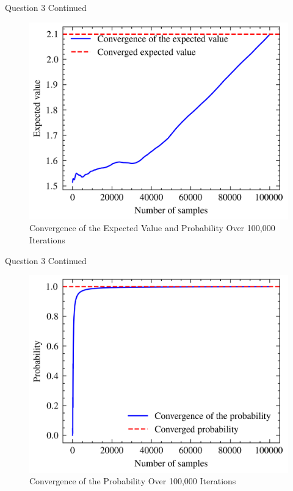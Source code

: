 \documentclass[compress,12pt]{beamer}
\begin{document}
\begin{frame}{Question 3 Continued}
    \begin{figure}
        \centering
        \includegraphics{imgs/convergence2.png}
        \caption{Convergence of the Expected Value and Probability Over 100,000 Iterations}
        \label{fig:probability}
    \end{figure}

\end{frame}

\begin{frame}{Question 3 Continued}
    \begin{figure}
        \centering
        \includegraphics{imgs/probabilityconvergence.png}
        \caption{Convergence of the Probability Over 100,000 Iterations}
        \label{fig:probability}
    \end{figure}

\end{frame}
\end{document}
